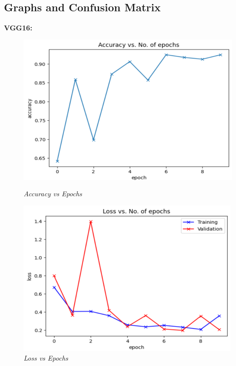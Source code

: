 \documentclass[12pt, a4paper]{report}
\begin{document}
\subsection{Graphs and Confusion Matrix}
\textbf{VGG16:}

\begin{figure}[htbp]
    \centering
    \begin{minipage}{0.3\textwidth}
        \centering
        \includegraphics[width=\linewidth]{report images/image21.png}
        \caption{\textit{Accuracy vs Epochs}}
    \end{minipage}%
    \hspace{0.03\textwidth} %
    \begin{minipage}{0.3\textwidth}
        \centering
        \includegraphics[width=\linewidth]{report images/image22.png}
        \caption{\textit{Loss vs Epochs}}

\end{minipage}
\end{figure}
\end{document}
